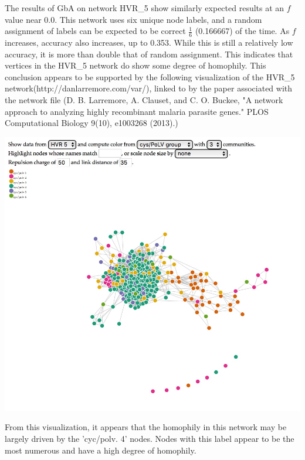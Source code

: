\documentclass[11pt, oneside]{article}   	%
\begin{document}
\indent\indent The results of GbA on network HVR\_5 show similarly expected results at an $f$ value near 0.0.  This network uses six unique node labels, and a random assignment of labels can be expected to be correct $\frac{1}{6}$ (0.166667) of the time.  As $f$ increases, accuracy also increases, up to 0.353.  While this is still a relatively low accuracy, it is more than double that of random assignment.  This indicates that vertices in the HVR\_5 network do show some degree of homophily.  This conclusion appears to be supported by the following visualization of the HVR\_5 network(http://danlarremore.com/var/), linked to by the paper associated with the network file (D. B. Larremore, A. Clauset, and C. O. Buckee, "A network approach to analyzing highly recombinant malaria parasite genes." PLOS Computational Biology 9(10), e1003268 (2013).)\\
\begin{center}\includegraphics[scale=0.3]{grab}\end{center}
\indent\indent From this visualization, it appears that the homophily in this network may be largely driven by the 'cyc/polv. 4' nodes.  Nodes with this label appear to be the most numerous and have a high degree of homophily.\\
\end{document}
